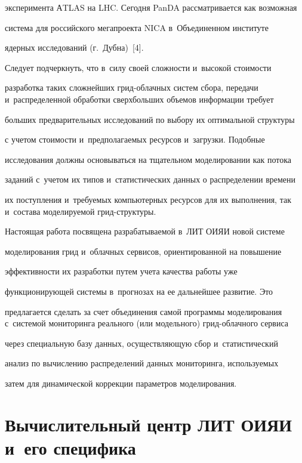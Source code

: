 эксперимента АTLAS на LHC. Сегодня PanDA рассматривается как возможная


система для российского мегапроекта NICA в~Объединенном институте


ядерных исследований (г.~Дубна)~[4].





  Следует подчеркнуть, что в~силу своей сложности и~высокой стоимости


разработка таких сложнейших грид-об\-лач\-ных систем сбора, передачи и~распределенной обработки сверхбольших объемов информации требует


больших предварительных исследований по выбору их оптимальной структуры


с учетом стоимости и~предполагаемых ресурсов и~загрузки. Подобные


исследования должны основываться на тщательном моделировании как потока


заданий с~учетом их типов и~статистических данных о распределении времени


их поступления и~требуемых компьютерных ресурсов для их выполнения, так и~состава моделируемой грид-струк\-туры.





  Настоящая работа посвящена разрабатываемой в~ЛИТ ОИЯИ новой системе


моделирования грид и~облачных сервисов, ориентированной на повышение


эффективности их разработки путем учета качества работы уже


функцио\-ни\-ру\-ющей системы в~прогнозах на ее дальнейшее развитие. Это


предлагается сделать за счет объединения самой программы моделирования с~системой мониторинга реального (или модельного) грид-об\-лач\-но\-го сервиса


через специальную базу данных, осуществляющую сбор и~статистический


анализ по вычислению распределений данных мониторинга, используемых


затем для динамической коррекции параметров моделирования.





\section{Вычислительный центр ЛИТ ОИЯИ и~его специфика}





